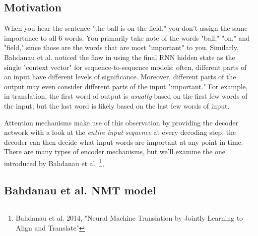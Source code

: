 \documentclass{tufte-handout}
\begin{document}
\subsection{Motivation}

When you hear the sentence "the ball is on the field," you don't assign the same importance to all 6 words. You primarily take note of the words "ball," "on," and "field," since those are the words that are most "important" to you. Similarly, Bahdanau et al. noticed the flaw in using the final RNN hidden state as the single "context vector" for sequence-to-sequence models: often, different parts of an input have different levels of significance. Moreover, different parts of the output may even consider different parts of the input "important." For example, in translation, the first word of output is \textit{usually} based on the first few words of the input, but the last word is likely based on the last few words of input.

Attention mechanisms make use of this observation by providing the decoder network with a look at the \textit{entire input sequence} at every decoding step; the decoder can then decide what input words are important at any point in time. There are many types of encoder mechanisms, but we'll examine the one introduced by Bahdanau et al.  \footnote{Bahdanau et al. 2014, "Neural Machine Translation by Jointly Learning to Align and Translate"}, 




\subsection{Bahdanau et al. NMT model}
\end{document}
